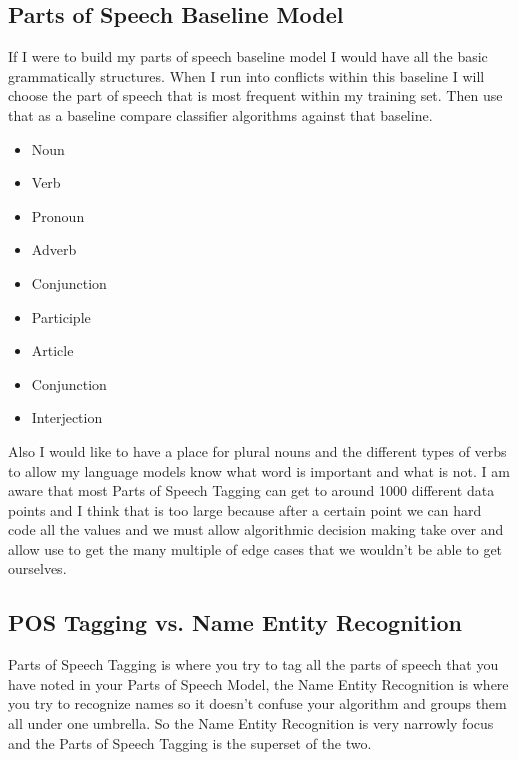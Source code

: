 \documentclass{article}
\begin{document}
\subsection{Parts of Speech Baseline Model}
If I were to build my parts of speech baseline model I would have all the basic grammatically structures.
When I run into conflicts within this baseline I will choose the part of speech that is most frequent within my training set. 
Then use that as a baseline compare classifier algorithms against that baseline.
\begin{itemize}
	\item Noun
	\item Verb
	\item Pronoun
	\item Adverb
	\item Conjunction
	\item Participle 
	\item Article
	\item Conjunction
	\item Interjection
\end{itemize}
Also I would like to have a place for plural nouns and the different types of verbs to allow my language models know what word is important and what is not. I am aware that most Parts of Speech Tagging can get to around 1000 different data points and I think that is too large because after a certain point we can hard code all the values and we must allow algorithmic decision making take over and allow use to get the many multiple of edge cases that we wouldn't be able to get ourselves. 
\subsection{POS Tagging vs. Name Entity Recognition}
Parts of Speech Tagging is where you try to tag all the parts of speech that you have noted in your Parts of Speech Model, the Name Entity Recognition is where you try to recognize names so it doesn't confuse your algorithm and groups them all under one umbrella. So the Name Entity Recognition is very narrowly focus and the Parts of Speech Tagging is the superset of the two.
\end{document}
